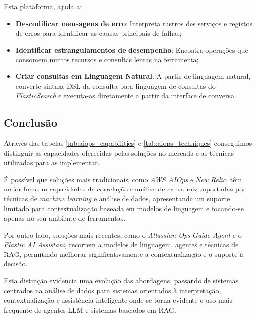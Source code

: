 		Esta plataforma, ajuda a:
		\begin{itemize}
			\item \textbf{Descodificar mensagens de erro}: Interpreta rastros dos serviços e registos de erros para identificar as causas principais de falhas;
			\item \textbf{Identificar estrangulamentos de desempenho}: Encontra operações que consomem muitos recursos e consultas lentas na ferramenta;
			\item \textbf{Criar consultas em Linguagem Natural}: A partir de linguagem natural, converte sintaxe \gls{DSL} da consulta para linguagem de consultas do \textit{ElasticSearch} e executa-as diretamente a partir da interface de conversa.
		\end{itemize}
	
	\subsection{Conclusão}
		Através das tabelas \ref{tab:aiops_capabilities} e \ref{tab:aiops_techniques} conseguimos distinguir as capacidades oferecidas pelas soluções no mercado e as técnicas utilizadas para as implementar. 
		
		É possível que soluções mais tradicionais, como \textit{AWS AIOps} e \textit{New Relic}, têm maior foco em capacidades de correlação e análise de causa raiz suportadas por técnicas de \textit{machine learning} e análise de dados, apresentando um suporte limitado para contextualização baseada em modelos de linguagem e focando-se apenas no seu ambiente de ferramentas.
		
		Por outro lado, soluções mais recentes, como o \textit{Atlassian Ops Guide Agent} e o \textit{Elastic AI Assistant}, recorrem a modelos de linguagem, agentes e técnicas de \gls{RAG}, permitindo melhorar significativamente a contextualização e o suporte à decisão.
		
		Esta distinção evidencia uma evolução das abordagens, passando de sistemas centrados na análise de dados para sistemas orientados à interpretação, contextualização e assistência inteligente onde se torna evidente o uso mais frequente de agentes \gls{LLM} e sistemas baseados em \gls{RAG}.
	

